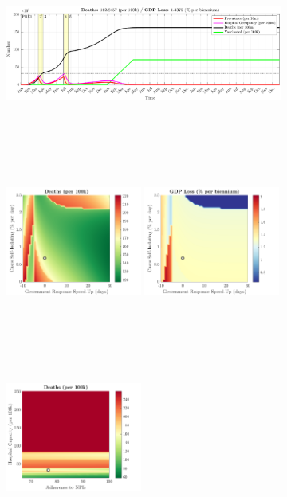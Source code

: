 \documentclass[paper=a4, fontsize=11pt]{scrartcl}
\numberwithin{figure}{section}
\numberwithin{table}{section}
\begin{document}
\begin{figure}[H]
\centering
    \begin{subfigure}[b]{\textwidth}
     	\includegraphics[width=\textwidth,height=5.5cm]{Counterfactuals/UK_spfl}
    \end{subfigure}
    \begin{subfigure}[b]{\textwidth}
      	\includegraphics[width=0.49\textwidth,height=6cm]{UK/SPANISH/ero_d}
	\hspace{0.05cm}
    	\includegraphics[width=0.49\textwidth,height=6cm]{UK/SPANISH/ero_g}
    \end{subfigure}
    \begin{subfigure}[b]{\textwidth}
      	\includegraphics[width=0.49\textwidth,height=6cm]{UK/SPANISH/npl_d}

\end{subfigure}
\end{figure}
\end{document}

